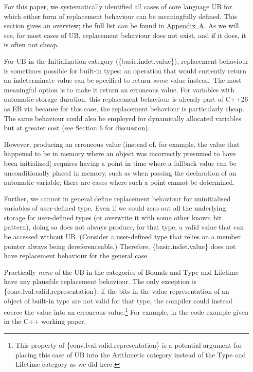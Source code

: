 For this paper, we systematically identified all cases of core language UB for which either form of replacement behaviour can be meaningfully defined. This section gives an overview; the full list can be found in \hyperref[appendix]{Appendix~A}. As we will see, for most cases of UB, replacement behaviour does not exist, and if it does, it is often not cheap.

For UB in the Initialization category (\{basic.indet.value\}), replacement behaviour is sometimes possible for built-in types: an operation that would currently return an indeterminate value can be specified to return \emph{some} value instead. The most meaningful option is to make it return an erroneous value. For variables with automatic storage duration, this replacement behaviour is already part of C++26 as EB via \cite{P2795R5} because for this case, the replacement behaviour is particularly cheap. The same  behaviour could also be employed for dynamically allocated variables but at greater cost (see \cite{P2723R1} Section 6 for discussion).

However, producing an erroneous value (instead of, for example, the value that happened to be in memory where an object was incorrectly presumed to have been initialized) requires having a point in time where a fallback value can be unconditionally placed in memory, such as when passing the declaration of an automatic variable; there are cases where such a point cannot be determined.

Further, we cannot in general define replacement behaviour for uninitialised variables of user-defined type. Even if we could zero out all the underlying storage for user-defined types (or overwrite it with some other known bit pattern), doing so does not always produce, for that type, a valid value that can be accessed without UB. (Consider a user-defined type that relies on a member pointer always being dereferenceable.) Therefore, \{basic.indet.value\} does not have replacement behaviour for the general case.

Practically \emph{none} of the UB in the categories of Bounds and Type and Lifetime have any plausible replacement behaviour. The only exception is \{conv.lval.valid.representation\}: if the bits in the value representation of an object of built-in type are not valid for that type, the compiler could instead coerce the value into an erroneous value.\footnote{This property of \{conv.lval.valid.representation\} is a potential argument for placing this case of UB into the Arithmetic category instead of the Type and Lifetime category as we did here.} For example, in the code example given in the C++ working paper,

